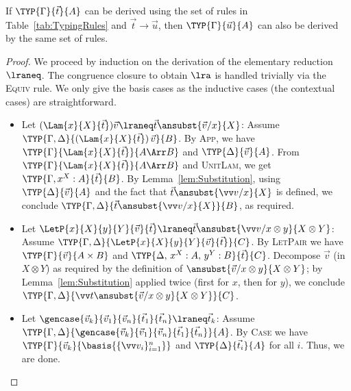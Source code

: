 \begin{restatetheorem}
  If $\TYP{\Gamma}{\vec{t}}{A}$ can be derived using the set of rules in
  Table~\ref{tab:TypingRules} and $\vec{t}\to\vec{u}$, then
  $\TYP{\Gamma}{\vec{u}}{A}$ can also be derived by the same set of rules.
\end{restatetheorem}
\begin{proof}
  We proceed by induction on the derivation of the elementary reduction
  $\lraneq$. The congruence closure to obtain $\lra$ is handled trivially via
  the \textsc{Equiv} rule. We only give the basis cases as the inductive cases (the contextual cases) are straightforward.
  \begin{itemize}
    \item Let $(\Lam{x}{X}{\vec t})\vec v \lraneq \vec t\ansubst{\vec v/x}{X}$:
      Assume $\TYP{\Gamma,\Delta}{(\Lam{x}{X}{\vec t})\,\vec v}{B}$. By
      \textsc{App}, we have $\TYP{\Gamma}{\Lam{x}{X}{\vec t}}{A\Arr B}$ and
      $\TYP{\Delta}{\vec v}{A}$.  From $\TYP{\Gamma}{\Lam{x}{X}{\vec t}}{A\Arr B}$
      and \textsc{UnitLam}, we get $\TYP{\Gamma,x^{X}:A}{\vec t}{B}$. By
      Lemma~\ref{lem:Substitution},
      using $\TYP{\Delta}{\vec v}{A}$ and the fact that $\vec t\ansubst{\vv
      v/x}{X}$ is defined, we conclude $\TYP{\Gamma,\Delta}{\vec t\ansubst{\vv
      v/x}{X}}{B}$, as required.

    \item Let $\LetP{x}{X}{y}{Y}{\vec v}{\vec t} \lraneq \vec t\ansubst{\vv
      v/x\otimes y}{X\otimes Y}$: Assume
      $\TYP{\Gamma,\Delta}{\LetP{x}{X}{y}{Y}{\vec v}{\vec t}}{C}$.  By
      \textsc{LetPair} we have $\TYP{\Gamma}{\vec v}{A\times B}$ and
      $\TYP{\Delta,\,x^{X}:A,\,y^{Y}:B}{\vec t}{C}$.  Decompose $\vec v$ (in
      $X\otimes Y$) as required by the definition of $\ansubst{\vec v/x\otimes
      y}{X\otimes Y}$; by Lemma~\ref{lem:Substitution}
      applied twice
      (first for $x$, then for $y$), we conclude $\TYP{\Gamma,\Delta}{\vv
      t\ansubst{\vec v/x\otimes y}{X\otimes Y}}{C}$.

    \item Let $\gencase{\vec{v}_{k}}{\vec{v}_{1}}{\vec{v}_{n}}{\vec{t}_{1}}{\vec{t}_{n}}
      \lraneq \vec{t}_{k}$: Assume
      $\TYP{\Gamma,\Delta}{\gencase{\vec{v}_{k}}{\vec{v}_{1}}{\vec{v}_{n}}{\vec{t}_{1}}{\vec{t}_{n}}}{A}$.
      By \textsc{Case} we have $\TYP{\Gamma}{{\vec{v}_{k}}}{\basis{\{\vv
      v_i\}_{i=1}^n}}$ and $\TYP{\Delta}{\vec t_i}{A}$ for all $i$.  Thus, we are
      done.


\end{itemize}
\end{proof}
